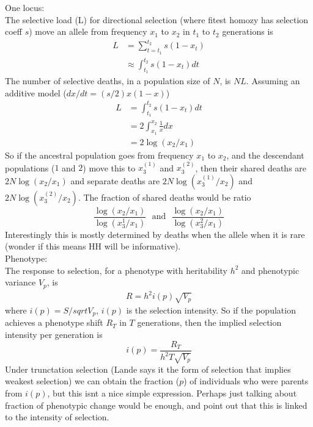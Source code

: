 \documentclass[a4paper,10pt]{article}
\begin{document}
One locus:\\
The selective load (L) for directional selection (where fitest homozy
has selection coeff $s$) move an allele from frequency $x_1$ to $x_2$
in $t_1$ to $t_2$ generations is
\begin{align}
L &= \sum_{t=t_1}^{t_2} s(1-x_t) \\
&\approx \int_{t_1}^{t_2}  s(1-x_t) dt
\end{align}
The number of selective deaths, in a population size of $N$, is
$NL$. Assuming an additive model ($dx/dt = (s/2)x(1-x)$) 
\begin{align}
L &= \int_{t_1}^{t_2}  s(1-x_t) dt\\
&= 2  \int_{x_1}^{x_2}  \frac{1}{x} dx\\
& = 2 \log(x_2/x_1) 
\end{align}
So if the ancestral population goes from frequency $x_1$ to $x_2$, and
the descendant populations ($1$ and $2$) move this to $x_3^{(1)}$ and
$x_3^{(2)}$, then their shared deaths are $2N\log(x_2/x_1)$ and separate
deaths are $2N\log(x_3^{(1)}/x_2)$ and
$2N\log(x_3^{(2)}/x_2)$. The fraction of shared deaths would be ratio
\begin{equation}
\frac{\log(x_2/x_1)}{\log(x_3^{1}/x_1)}~~~\textrm{and}~~~\frac{\log(x_2/x_1)}{\log(x_3^{2}/x_1)}
\end{equation}
Interestingly this is mostly determined by deaths when the
allele when it is rare (wonder if this means HH will be informative).\\

Phenotype:\\
The response to selection, for a phenotype with heritability $h^2$ and
phenotypic variance $V_p$, is 
\begin{align}
R = h^2 i(p) \sqrt{V_p}
\end{align}
where $i(p)=S/sqrt{V_p}$, $i(p)$ is the selection intensity. So if the
population achieves a phenotype shift $R_T$ in $T$ generations, then
the implied selection intensity per generation is 
\begin{equation}
i(p) = \frac{R_T}{h^2 T \sqrt{V_p}}
\end{equation}  
Under trunctation selection (Lande says it the form of selection that
implies weakest selection) we can obtain the fraction ($p$) of individuals
who were parents from $i(p)$, but this isnt a nice simple
expression. Perhaps just talking about fraction of phenotypic change would be
enough, and point out that this is linked to the intensity of
selection. 
\end{document}
